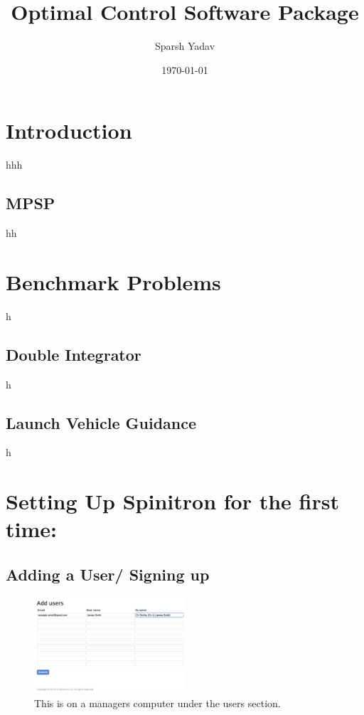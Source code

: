 \documentclass[12pt]{article}
\title{Optimal Control Software Package}
\author{Sparsh Yadav}
\date{\today}
\begin{document}
\maketitle{}

\tableofcontents

\clearpage
\newpage

\section{Introduction}
hhh

\subsection{MPSP}
hh
\clearpage
\newpage

\section{Benchmark Problems}
h
\subsection{Double Integrator}
h
\subsection{Launch Vehicle Guidance}
h

 
\clearpage
\newpage

\section{Setting Up Spinitron for the first time:}



\subsection{Adding a User/ Signing up}

\begin{figure} %
    \centering
    \includegraphics[width=0.50\textwidth]{images/Add_users.png}
    \caption{This is on a managers computer under the users section.}
    \label{fig1}
\end{figure}
\end{document}
